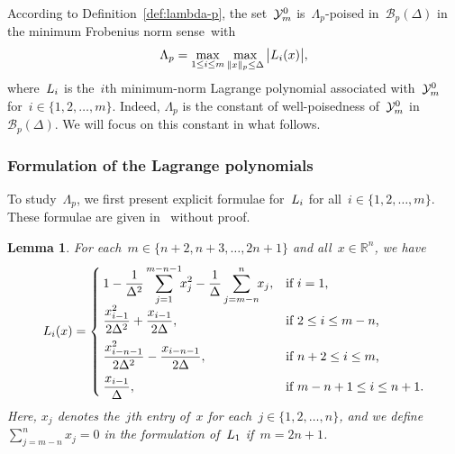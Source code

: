 \documentclass{article}
\numberwithin{equation}{section}
\theoremstyle{definition}
\theoremstyle{plain}
\newtheorem{lemma}{Lemma}[section]
\theoremstyle{remark}
\newcommand*{\abs}[2][]{#1\lvert#2#1\rvert}
\newcommand*{\lagp}[1][]{L\ifblank{#1}{}{_{#1}}}
\newcommand*{\norm}[2][]{#1\lVert#2#1\rVert}
\newcommand*{\R}{\mathbb{R}}
\newcommand*{\set}[2][]{#1\{#2#1\}}
\newcommand*{\xpt}[1][]{\mathcal{Y}\ifblank{#1}{}{^{#1}}}
\begin{document}
According to Definition~\ref{def:lambda-p}, the set~$\xpt[0]_m$ is~$\Lambda_p$-poised in~$\mathcal{B}_p(\Delta)$ in the minimum Frobenius norm sense~with
\begin{equation}
    \label{eq:Lambdap}
    \Lambda_p = \max_{1 \le i \le m} \max_{\norm{x}_p \le \Delta} \abs[\big]{\lagp[i](x)},
\end{equation}
where~$\lagp[i]$ is the~$i$th minimum-norm Lagrange polynomial associated with~$\xpt[0]_m$ for~$i \in \set{1, 2, \dots, m}$.
Indeed, $\Lambda_p$ is the {constant of well-poisedness} of~$\xpt[0]_m$ in~$\mathcal{B}_p(\Delta)$.
We will focus on this constant in what follows.

\subsubsection{Formulation of the Lagrange polynomials}

To study~$\Lambda_p$, we first present explicit formulae for~$\lagp[i]$ for all~$i \in \set{1, 2, \dots, m}$.
These formulae are given in~\cite[\S~3]{Powell_2006} without proof.

\begin{lemma}
    \label{lem:lagp}
    For each~$m \in \set{n + 2, n + 3, \dots,  2n + 1}$ and all~$x \in \R^n$, we have
    \begin{equation*}
        \lagp[i](x) =
        \begin{cases}
            \displaystyle 1 - \frac{1}{\Delta^2} \sum_{j = 1}^{m - n - 1} \!\! x_j^2 - \frac{1}{\Delta} \sum_{j = m - n}^n \!\! x_j,    & \text{if~$i = 1$,}\\[2ex]
            \displaystyle \frac{x_{i - 1}^2}{2\Delta^2} + \frac{x_{i - 1}}{2\Delta},                                                    & \text{if~$2 \le i \le m - n$,}\\[2ex]
            \displaystyle \frac{x_{i -n - 1}^2}{2\Delta^2} - \frac{x_{i -n- 1}}{2\Delta},                                               & \text{if~$n+2\le i \le m$,}\\[2ex]
            \displaystyle \frac{x_{i - 1}}{\Delta},                                                                                     & \text{if~$m - n + 1 \le i \le n + 1$.}
        \end{cases}
    \end{equation*}
    Here, $x_j$ denotes the~$j$th entry of~$x$ for each~$j\in\{1,2, \dots, n\}$, and we define~$\sum_{j = m - n}^n x_j = 0$ in the
    formulation of~$\lagp[1]$ if~$m = 2n+1$.
\end{lemma}
\end{document}
